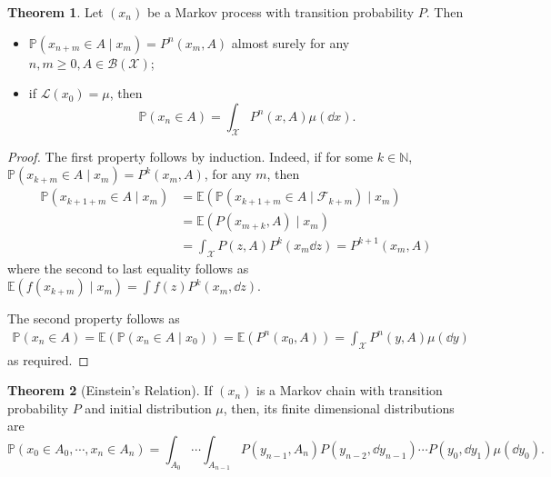 \documentclass[]{article}
\theoremstyle{definition}
\newtheorem{theorem}{Theorem}
\theoremstyle{definition}
\begin{document}
\begin{theorem}
  Let \((x_n)\) be a Markov process with transition probability \(P\). Then 
  \begin{itemize}
    \item \(\mathbb{P}(x_{n + m} \in A \mid x_m) = P^n(x_m, A)\) almost surely for any 
      \(n, m \ge 0, A \in \mathcal{B}(\mathcal{X})\);
    \item if \(\mathcal{L}(x_0) = \mu\), then 
      \[\mathbb{P}(x_n \in A) = \int_{\mathcal{X}} P^n(x, A) \mu(\dd x).\] 
  \end{itemize}
\end{theorem}
\begin{proof}
  The first property follows by induction. Indeed, if
  for some \(k \in \mathbb{N}\), \(\mathbb{P}(x_{k + m} \in A \mid x_m) = P^k(x_m, A)\), 
  for any \(m\), then 
  \[\begin{split}
    \mathbb{P}(x_{k + 1 + m} \in A \mid x_m) 
    & = \mathbb{E}(\mathbb{P}(x_{k + 1 + m} \in A \mid \mathcal{F}_{k + m}) \mid x_m) \\
    & = \mathbb{E}(P(x_{m + k}, A) \mid x_m) \\
    & = \int_{\mathcal{X}}P(z, A) P^k(x_m \dd z) = P^{k + 1}(x_m, A)
  \end{split}\]
  where the second to last equality follows as \(\mathbb{E}(f(x_{k + m}) \mid x_m) = 
  \int f(z) P^k(x_m, \dd z)\).

  The second property follows as 
  \[\begin{split}
    \mathbb{P}(x_n \in A) = \mathbb{E}(\mathbb{P}(x_n \in A \mid x_0)) 
    = \mathbb{E}(P^n(x_0, A)) = \int_{\mathcal{X}}P^n(y, A) \mu(\dd y)
  \end{split}\]
  as required.
\end{proof}

\begin{theorem}[Einstein's Relation]
  If \((x_n)\) is a Markov chain with transition probability \(P\) and initial 
  distribution \(\mu\), then, its finite dimensional distributions are 
  \[\mathbb{P}(x_0 \in A_0, \cdots, x_n \in A_n) = 
    \int_{A_0} \cdots \int_{A_{n - 1}} P(y_{n - 1}, A_n) P(y_{n - 2}, \dd y_{n - 1}) \cdots P(y_0, \dd y_1) \mu(\dd y_0).\]
\end{theorem}
\end{document}
